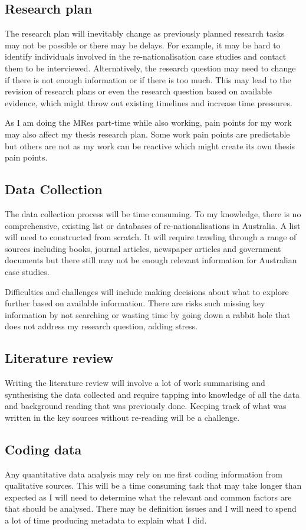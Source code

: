 \documentclass{article}
\begin{document}
\subsection*{Research plan}
The research plan will inevitably change as previously planned research tasks may not be possible or there may be delays. For example, it may be hard to identify individuals involved in the re-nationalisation case studies and contact them to be interviewed. Alternatively, the research question may need to change if there is not enough information or if there is too much. This may lead to the revision of research plans or even the research question based on available evidence, which might throw out existing timelines and increase time pressures.\par
As I am doing the MRes part-time while also working, pain points for my work may also affect my thesis research plan. Some work pain points are predictable but others are not as my work can be reactive which might create its own thesis pain points.
\subsection*{Data Collection}
The data collection process will be time consuming. To my knowledge, there is no comprehensive, existing list or databases of re-nationalisations in Australia. A list will need to constructed from scratch. It will require trawling through a range of sources including books, journal articles, newspaper articles and government documents but there still may not be enough relevant information for Australian case studies.\par
Difficulties and challenges will include making decisions about what to explore further based on available information. There are risks such missing key information by not searching or wasting time by going down a rabbit hole that does not address my research question, adding stress.\par 
\subsection*{Literature review}
Writing the literature review will involve a lot of work summarising and synthesising the data collected and require tapping into knowledge of all the data and background reading that was previously done. Keeping track of what was written in the key sources without re-reading will be a challenge.
\subsection*{Coding data}
Any quantitative data analysis may rely on me first coding information from qualitative sources. This will be a time consuming task that may take longer than expected as I will need to determine what the relevant and common factors are that should be analysed. There may be definition issues and I will need to spend a lot of time producing metadata to explain what I did. 
\end{document}
